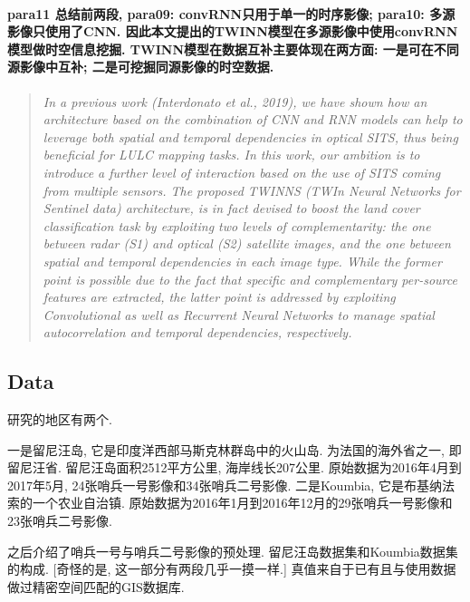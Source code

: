 \paragraph*{para11
    \textcolor[RGB]{17, 205, 29}{总结前两段, para09: convRNN只用于单一的时序影像; para10: 多源影像只使用了CNN. 因此本文提出的TWINN模型在多源影像中使用convRNN模型做时空信息挖掘. TWINN模型在数据互补主要体现在两方面: 一是可在不同源影像中互补; 二是可挖掘同源影像的时空数据.}}
\begin{quotation}
    \itshape
    In a previous work (Interdonato et al., 2019), we have shown how an architecture based on the combination of CNN and RNN models can help to leverage both spatial and temporal dependencies in optical SITS, thus being beneficial for LULC mapping tasks. In this work, our ambition is to introduce a further level of interaction based on the use of SITS coming from multiple sensors. The proposed TWINNS (TWIn Neural Networks for Sentinel data) architecture, is in fact devised to boost the land cover classification task by exploiting two levels of complementarity: the one between radar (S1) and optical (S2) satellite images, and the one between spatial and temporal dependencies in each image type. While the former point is possible due to the fact that specific and complementary per-source features are extracted, the latter point is addressed by exploiting Convolutional as well as Recurrent Neural Networks to manage spatial autocorrelation and temporal dependencies, respectively.
\end{quotation}

\subsection{Data}
研究的地区有两个. 

一是留尼汪岛, 它是印度洋西部马斯克林群岛中的火山岛. 为法国的海外省之一, 即留尼汪省. 留尼汪岛面积2512平方公里, 海岸线长207公里. 原始数据为2016年4月到2017年5月, 24张哨兵一号影像和34张哨兵二号影像. 二是Koumbia, 它是布基纳法索的一个农业自治镇. 原始数据为2016年1月到2016年12月的29张哨兵一号影像和23张哨兵二号影像. 

之后介绍了哨兵一号与哨兵二号影像的预处理. 留尼汪岛数据集和Koumbia数据集的构成. [奇怪的是, 这一部分有两段几乎一摸一样.] 真值来自于已有且与使用数据做过精密空间匹配的GIS数据库.


